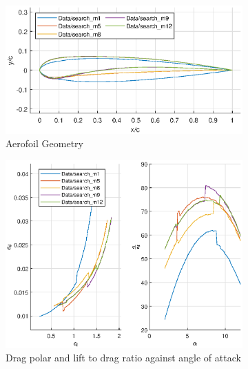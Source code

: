 \documentclass{article}
\begin{document}
\begin{figure}[H]
    \begin{subfigure}{0.54\textwidth}
        \centering
        \includegraphics[width=1.2\textwidth, center]{figures/loRe_geometry_12.eps}
        \caption{Aerofoil Geometry}
        \label{fig:m12_geometry}
    \end{subfigure}
    \begin{subfigure}{0.45\textwidth}
        \centering
        \includegraphics[width=1.2\textwidth, center]{figures/loRe_lod_12.eps}
        \caption{Drag polar and lift to drag ratio against angle of attack}
        \label{fig:m12_lod}
    \end{subfigure}
    \caption{}
\end{figure}
\end{document}
